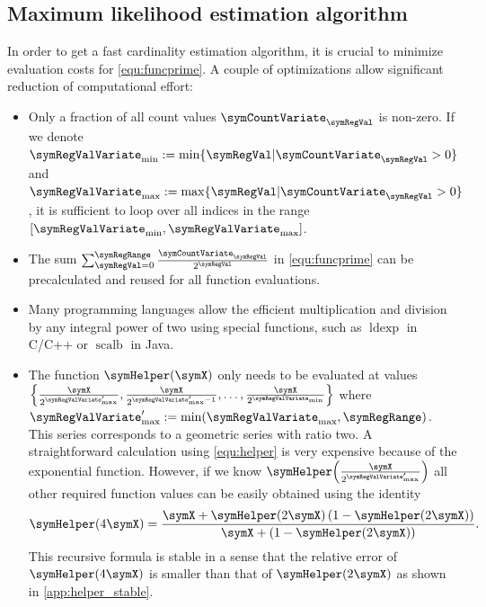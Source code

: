 \documentclass[a4paper]{scrartcl}
\begin{document}
\subsection{Maximum likelihood estimation algorithm}
In order to get a fast cardinality estimation algorithm, it is crucial to minimize evaluation costs for \eqref{equ:funcprime}. A couple of optimizations allow significant reduction of computational effort:
\begin{itemize}
\item Only a fraction of all count values $\symCountVariate_\symRegVal$ is non-zero. If we denote $\symRegValVariate_\text{min}:=\min\lbrace \symRegVal\vert\symCountVariate_\symRegVal>0\rbrace$ and $\symRegValVariate_\text{max}:=\max\lbrace \symRegVal\vert\symCountVariate_\symRegVal>0\rbrace$,  it is sufficient to loop over all indices in the range $[\symRegValVariate_\text{min}, \symRegValVariate_\text{max}]$.
\item The sum $\sum_{\symRegVal=0}^\symRegRange \frac{\symCountVariate_\symRegVal}{2^\symRegVal}$ in \eqref{equ:funcprime} can be precalculated and reused for all function evaluations.
\item Many programming languages allow the efficient multiplication and division by any integral power of two using special functions, such as $\operatorname{ldexp}$ in C/C++ or $\operatorname{scalb}$ in Java.
\item The function $\symHelper(\symX)$ only needs to be evaluated at values $\left\lbrace\frac{\symX}{2^{\symRegValVariate'_\text{max}}},\frac{\symX}{2^{\symRegValVariate'_\text{max}-1}},\ldots,\frac{\symX}{2^{\symRegValVariate_\text{min}}}\right\rbrace$ where $\symRegValVariate'_\text{max} := \min(\symRegValVariate_\text{max}, \symRegRange)$. This series corresponds to a geometric series with ratio two. A straightforward calculation using \eqref{equ:helper} is very expensive because of the exponential function. However, if we know $\symHelper\!\left(\frac{\symX}{2^{\symRegValVariate'_\text{max}}}\right)$ all other required function values can be easily obtained using the identity
\begin{equation}
\label{equ:helper_recursion1}
\symHelper(4\symX) = \frac{\symX+\symHelper(2\symX)\left(1-\symHelper(2\symX)\right)}{\symX+\left(1-\symHelper(2\symX)\right)}.
\end{equation}
This recursive formula is stable in a sense that the relative error of $\symHelper(4\symX)$ is smaller than that of $\symHelper(2\symX)$ as shown in \cref{app:helper_stable}.


\end{itemize}
\end{document}

